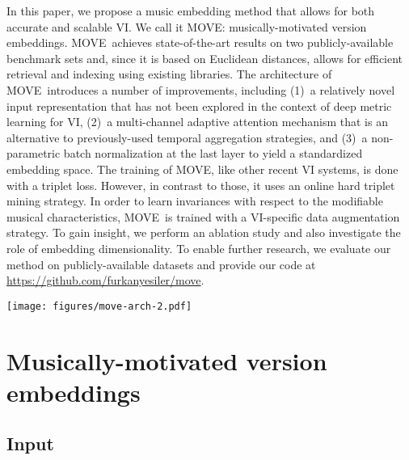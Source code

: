 \documentclass[letterpaper]{article}
\newcommand{\modelname}{MOVE}
\begin{document}
In this paper, we propose a music embedding method that allows for both accurate and scalable VI. We call it \modelname: musically-motivated version embeddings. \modelname\ achieves state-of-the-art results on two publicly-available benchmark sets and, since it is based on Euclidean distances, allows for efficient retrieval and indexing using existing libraries. The architecture of \modelname\ introduces a number of improvements, including (1)~a relatively novel input representation that has not been explored in the context of deep metric learning for VI, (2)~a multi-channel adaptive attention mechanism that is an alternative to previously-used temporal aggregation strategies, and (3)~a non-parametric batch normalization at the last layer to yield a standardized embedding space. The training of \modelname, like other recent VI systems, is done with a triplet loss. However, in contrast to those, it uses an online hard triplet mining strategy. In order to learn invariances with respect to the modifiable musical characteristics, \modelname\ is trained with a VI-specific data augmentation strategy. 
To gain insight, we perform an ablation study and also investigate the role of embedding dimensionality. 
To enable further research, we evaluate our method on publicly-available datasets and provide our code at \url{https://github.com/furkanyesiler/move}.

 
\begin{figure*}[tb!]
  \centering
  \texttt{[image: figures/move-arch-2.pdf]}
\caption{Block diagram of \modelname's architecture.}
  \label{fig:model}
\end{figure*}

\section{Musically-motivated version embeddings}
\label{sec:model}


\subsection{Input}
\end{document}

